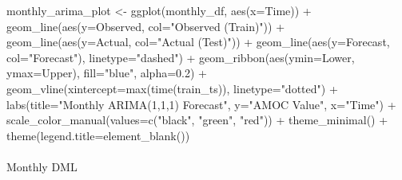 \documentclass[
  11pt,
]{article}
\makeatletter
\let\oldparagraph\paragraph
\renewcommand{\paragraph}{
    \@ifstar
      \xxxParagraphStar
      \xxxParagraphNoStar
  }
\newcommand{\xxxParagraphStar}[1]{\oldparagraph*{#1}\mbox{}}
\newcommand{\xxxParagraphNoStar}[1]{\oldparagraph{#1}\mbox{}}
\newenvironment{Shaded}{\begin{snugshade}}{\end{snugshade}}
\newcommand{\AttributeTok}[1]{\textcolor[rgb]{0.40,0.45,0.13}{#1}}
\newcommand{\FloatTok}[1]{\textcolor[rgb]{0.68,0.00,0.00}{#1}}
\newcommand{\FunctionTok}[1]{\textcolor[rgb]{0.28,0.35,0.67}{#1}}
\newcommand{\NormalTok}[1]{\textcolor[rgb]{0.00,0.23,0.31}{#1}}
\newcommand{\OtherTok}[1]{\textcolor[rgb]{0.00,0.23,0.31}{#1}}
\newcommand{\SpecialCharTok}[1]{\textcolor[rgb]{0.37,0.37,0.37}{#1}}
\newcommand{\StringTok}[1]{\textcolor[rgb]{0.13,0.47,0.30}{#1}}
\makeatother
\begin{document}
\begin{Shaded}
\begin{Highlighting}[]
\NormalTok{monthly\_arima\_plot }\OtherTok{\textless{}{-}} \FunctionTok{ggplot}\NormalTok{(monthly\_df, }\FunctionTok{aes}\NormalTok{(}\AttributeTok{x=}\NormalTok{Time)) }\SpecialCharTok{+}
  \FunctionTok{geom\_line}\NormalTok{(}\FunctionTok{aes}\NormalTok{(}\AttributeTok{y=}\NormalTok{Observed, }\AttributeTok{col=}\StringTok{"Observed (Train)"}\NormalTok{)) }\SpecialCharTok{+}
  \FunctionTok{geom\_line}\NormalTok{(}\FunctionTok{aes}\NormalTok{(}\AttributeTok{y=}\NormalTok{Actual, }\AttributeTok{col=}\StringTok{"Actual (Test)"}\NormalTok{)) }\SpecialCharTok{+}
  \FunctionTok{geom\_line}\NormalTok{(}\FunctionTok{aes}\NormalTok{(}\AttributeTok{y=}\NormalTok{Forecast, }\AttributeTok{col=}\StringTok{"Forecast"}\NormalTok{), }\AttributeTok{linetype=}\StringTok{"dashed"}\NormalTok{) }\SpecialCharTok{+}
  \FunctionTok{geom\_ribbon}\NormalTok{(}\FunctionTok{aes}\NormalTok{(}\AttributeTok{ymin=}\NormalTok{Lower, }\AttributeTok{ymax=}\NormalTok{Upper), }\AttributeTok{fill=}\StringTok{"blue"}\NormalTok{, }\AttributeTok{alpha=}\FloatTok{0.2}\NormalTok{) }\SpecialCharTok{+}
  \FunctionTok{geom\_vline}\NormalTok{(}\AttributeTok{xintercept=}\FunctionTok{max}\NormalTok{(}\FunctionTok{time}\NormalTok{(train\_ts)), }\AttributeTok{linetype=}\StringTok{"dotted"}\NormalTok{) }\SpecialCharTok{+}
  \FunctionTok{labs}\NormalTok{(}\AttributeTok{title=}\StringTok{"Monthly ARIMA(1,1,1) Forecast"}\NormalTok{, }\AttributeTok{y=}\StringTok{"AMOC Value"}\NormalTok{, }\AttributeTok{x=}\StringTok{"Time"}\NormalTok{) }\SpecialCharTok{+}
  \FunctionTok{scale\_color\_manual}\NormalTok{(}\AttributeTok{values=}\FunctionTok{c}\NormalTok{(}\StringTok{"black"}\NormalTok{, }\StringTok{"green"}\NormalTok{, }\StringTok{"red"}\NormalTok{)) }\SpecialCharTok{+}
  \FunctionTok{theme\_minimal}\NormalTok{() }\SpecialCharTok{+}
  \FunctionTok{theme}\NormalTok{(}\AttributeTok{legend.title=}\FunctionTok{element\_blank}\NormalTok{())}
\end{Highlighting}
\end{Shaded}

\paragraph{Monthly DML}\label{monthly-dml}
\end{document}
